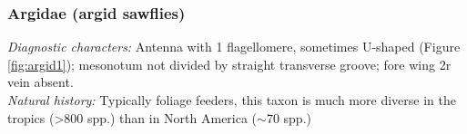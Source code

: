 \documentclass[letterpaper, 11pt]{article}
\begin{document}
\subsubsection{Argidae (argid sawflies)}
\noindent{}\textit{Diagnostic characters:} Antenna with 1 flagellomere, sometimes U-shaped (Figure \ref{fig:argid1}); mesonotum not divided by straight transverse groove; fore wing 2r vein absent.\\

\noindent{}\textit{Natural history:} Typically foliage feeders, this taxon is much more diverse in the tropics (\textgreater800 spp.) than in North America ($\sim$70 spp.)\\

\begin{figure}[ht!]
    \centering
    \begin{subfigure}[ht!]{0.11\textwidth}

\end{subfigure}
\end{figure}
\end{document}

